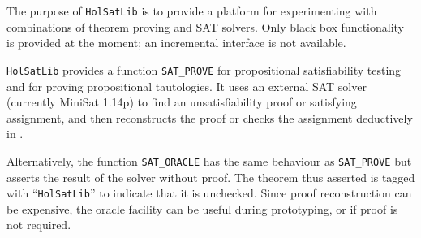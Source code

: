 


\renewcommand{\t}[1]{\mbox{\small\tt #1}}



\newcommand\Hol{HOL}





%

\setcounter{sessioncount}{0}

%

The purpose of {\tt{HolSatLib}} is to provide a platform for experimenting with combinations of theorem proving and SAT solvers. Only black box functionality is provided at the moment; an incremental interface is not available.

{\tt{HolSatLib}} provides a function {\tt SAT\_PROVE}  for propositional satisfiability testing and for proving propositional tautologies. It uses an external SAT solver (currently MiniSat 1.14p) to find an unsatisfiability proof or satisfying assignment, and then reconstructs the proof or checks the assignment deductively in \HOL.

Alternatively, the function {\tt SAT\_ORACLE}  has the same behaviour as {\tt SAT\_PROVE} but asserts the result of the solver without proof. The theorem thus asserted is tagged with ``{\tt{HolSatLib}}'' to indicate that it is unchecked. Since proof reconstruction can be expensive, the oracle facility can be useful during prototyping, or if proof is not required.

